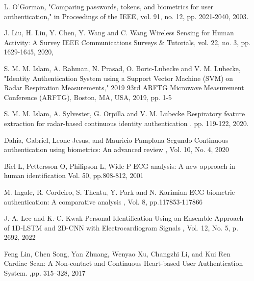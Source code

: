 \begin{bib}[100]

  L. O'Gorman, "Comparing passwords, tokens, and biometrics for user authentication," in Proceedings of the IEEE, vol. 91, no. 12, pp. 2021-2040, 2003.

  J. Liu, H. Liu, Y. Chen, Y. Wang and C. Wang
  \newblock Wireless Sensing for Human Activity: A Survey
  \newblock IEEE Communications Surveys \& Tutorials, vol. 22, no. 3, pp. 1629-1645, 2020,

  S. M. M. Islam, A. Rahman, N. Prasad, O. Boric-Lubecke and V. M. Lubecke, "Identity Authentication System using a Support Vector Machine (SVM) on Radar Respiration Measurements," 2019 93rd ARFTG Microwave Measurement Conference (ARFTG), Boston, MA, USA, 2019, pp. 1-5

  S. M. M. Islam, A. Sylvester, G. Orpilla and V. M. Lubecke
  \newblock Respiratory feature extraction for radar-based continuous identity authentication
  . pp. 119-122, 2020.
  
  Dahia, Gabriel, Leone Jesus, and Mauricio Pamplona Segundo
  \newblock Continuous authentication using biometrics: An advanced review
  , Vol. 10, No. 4, 2020

  Biel L, Pettersson O, Philipson L, Wide P
  \newblock ECG analysis: A new approach in human identification
   Vol. 50, pp.808-812, 2001

  M. Ingale, R. Cordeiro, S. Thentu, Y. Park and N. Karimian
  \newblock ECG biometric authentication: A comparative analysis
  , Vol. 8, pp.117853-117866

  J.-A. Lee and K.-C. Kwak
  \newblock Personal Identification Using an Ensemble Approach of 1D-LSTM and 2D-CNN with Electrocardiogram Signals
  ,  Vol. 12, No. 5, p. 2692, 2022

  Feng Lin, Chen Song, Yan Zhuang, Wenyao Xu, Changzhi Li, and Kui Ren
  \newblock Cardiac Scan: A Non-contact and Continuous Heart-based User Authentication System. 
   ,pp. 315–328, 2017


\end{bib}
